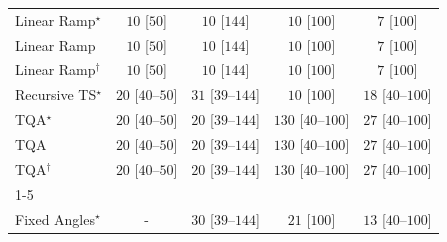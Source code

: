 \begin{tabular}{l|cccc|}
Linear Ramp$^\star$ & {\cellcolor[HTML]{F7FCF5}} \color[HTML]{000000} $10$ [$50$] & {\cellcolor[HTML]{F7FCF5}} \color[HTML]{000000} $10$ [$144$] & {\cellcolor[HTML]{F7FCF5}} \color[HTML]{000000} $10$ [$100$] & {\cellcolor[HTML]{F7FCF5}} \color[HTML]{000000} $7$ [$100$] \\
Linear Ramp & {\cellcolor[HTML]{F7FCF5}} \color[HTML]{000000} $10$ [$50$] & {\cellcolor[HTML]{F7FCF5}} \color[HTML]{000000} $10$ [$144$] & {\cellcolor[HTML]{F7FCF5}} \color[HTML]{000000} $10$ [$100$] & {\cellcolor[HTML]{F7FCF5}} \color[HTML]{000000} $7$ [$100$] \\
Linear Ramp$^\dagger$ & {\cellcolor[HTML]{F7FCF5}} \color[HTML]{000000} $10$ [$50$] & {\cellcolor[HTML]{F7FCF5}} \color[HTML]{000000} $10$ [$144$] & {\cellcolor[HTML]{F7FCF5}} \color[HTML]{000000} $10$ [$100$] & {\cellcolor[HTML]{F7FCF5}} \color[HTML]{000000} $7$ [$100$] \\
Recursive TS$^\star$ & {\cellcolor[HTML]{F5FBF2}} \color[HTML]{000000} $20$ [$40$--$50$] & {\cellcolor[HTML]{F3FAF0}} \color[HTML]{000000} $31$ [$39$--$144$] & {\cellcolor[HTML]{F7FCF5}} \color[HTML]{000000} $10$ [$100$] & {\cellcolor[HTML]{F5FBF3}} \color[HTML]{000000} $18$ [$40$--$100$] \\
TQA$^\star$ & {\cellcolor[HTML]{F5FBF2}} \color[HTML]{000000} $20$ [$40$--$50$] & {\cellcolor[HTML]{F5FBF2}} \color[HTML]{000000} $20$ [$39$--$144$] & {\cellcolor[HTML]{DFF3DA}} \color[HTML]{000000} $130$ [$40$--$100$] & {\cellcolor[HTML]{F4FBF1}} \color[HTML]{000000} $27$ [$40$--$100$] \\
TQA & {\cellcolor[HTML]{F5FBF2}} \color[HTML]{000000} $20$ [$40$--$50$] & {\cellcolor[HTML]{F5FBF2}} \color[HTML]{000000} $20$ [$39$--$144$] & {\cellcolor[HTML]{DFF3DA}} \color[HTML]{000000} $130$ [$40$--$100$] & {\cellcolor[HTML]{F4FBF1}} \color[HTML]{000000} $27$ [$40$--$100$] \\
TQA$^\dagger$ & {\cellcolor[HTML]{F5FBF2}} \color[HTML]{000000} $20$ [$40$--$50$] & {\cellcolor[HTML]{F5FBF2}} \color[HTML]{000000} $20$ [$39$--$144$] & {\cellcolor[HTML]{DFF3DA}} \color[HTML]{000000} $130$ [$40$--$100$] & {\cellcolor[HTML]{F4FBF1}} \color[HTML]{000000} $27$ [$40$--$100$] \\
\cline{1-5}
\multicolumn{5}{c}{\rule{0pt}{8pt}PP} \\
\midrule
Fixed Angles$^\star$ & {\cellcolor[HTML]{000000}} \color[HTML]{F1F1F1} {\cellcolor{white}} \color{black} - & {\cellcolor[HTML]{F3FAF0}} \color[HTML]{000000} $30$ [$39$--$144$] & {\cellcolor[HTML]{F5FBF2}} \color[HTML]{000000} $21$ [$100$] & {\cellcolor[HTML]{F6FCF4}} \color[HTML]{000000} $13$ [$40$--$100$] \\

\end{tabular}
